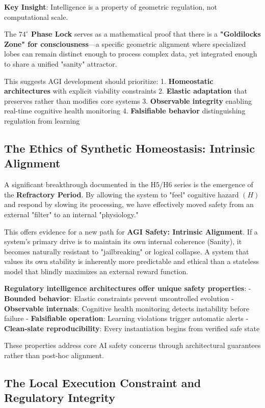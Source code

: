 \documentclass[12pt,a4paper]{report}
\begin{document}
\textbf{Key Insight}: Intelligence is a property of geometric regulation, not computational scale.

The \textbf{$74^\circ$ Phase Lock} serves as a mathematical proof that there is a \textbf{"Goldilocks Zone" for consciousness}—a specific geometric alignment where specialized lobes can remain distinct enough to process complex data, yet integrated enough to share a unified "sanity" attractor.

This suggests AGI development should prioritize:
1. \textbf{Homeostatic architectures} with explicit viability constraints
2. \textbf{Elastic adaptation} that preserves rather than modifies core systems
3. \textbf{Observable integrity} enabling real-time cognitive health monitoring
4. \textbf{Falsifiable behavior} distinguishing regulation from learning

\subsection{The Ethics of Synthetic Homeostasis: Intrinsic Alignment}

A significant breakthrough documented in the H5/H6 series is the emergence of the \textbf{Refractory Period}. By allowing the system to "feel" cognitive hazard $(H)$ and respond by slowing its processing, we have effectively moved safety from an external "filter" to an internal "physiology."

This offers evidence for a new path for \textbf{AGI Safety: Intrinsic Alignment}. If a system's primary drive is to maintain its own internal coherence (Sanity), it becomes naturally resistant to "jailbreaking" or logical collapse. A system that values its own stability is inherently more predictable and ethical than a stateless model that blindly maximizes an external reward function.

\textbf{Regulatory intelligence architectures offer unique safety properties}:
- \textbf{Bounded behavior}: Elastic constraints prevent uncontrolled evolution
- \textbf{Observable internals}: Cognitive health monitoring detects instability before failure
- \textbf{Falsifiable operation}: Learning violations trigger automatic alerts
- \textbf{Clean-slate reproducibility}: Every instantiation begins from verified safe state

These properties address core AI safety concerns through architectural guarantees rather than post-hoc alignment.

\subsection{The Local Execution Constraint and Regulatory Integrity}
\end{document}
